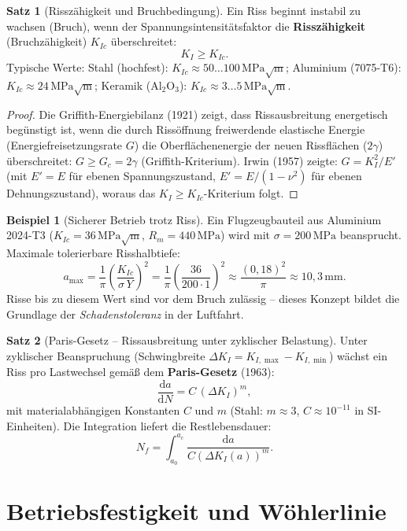 ﻿\documentclass[a4paper,12pt]{report}
\theoremstyle{definition}
\newtheorem{beispiel}{Beispiel}
\newtheorem{satz}{Satz}
\begin{document}
\begin{satz}[Risszähigkeit und Bruchbedingung]
Ein Riss beginnt instabil zu wachsen (Bruch), wenn der
Spannungsintensitätsfaktor die \textbf{Risszähigkeit} (Bruchzähigkeit) $K_{Ic}$
überschreitet:
\[
  K_I \ge K_{Ic}.
\]
Typische Werte: Stahl (hochfest): $K_{Ic} \approx 50\ldots100\,\mathrm{MPa\sqrt{m}}$;
Aluminium (7075-T6): $K_{Ic} \approx 24\,\mathrm{MPa\sqrt{m}}$;
Keramik ($\mathrm{Al_2O_3}$): $K_{Ic} \approx 3\ldots5\,\mathrm{MPa\sqrt{m}}$.
\end{satz}
\begin{proof}
Die Griffith-Energiebilanz (1921) zeigt, dass Rissausbreitung energetisch
begünstigt ist, wenn die durch Rissöffnung freiwerdende elastische
Energie (Energiefreisetzungsrate $G$) die Oberflächenenergie der
neuen Rissflächen ($2\gamma$) überschreitet:
$G \ge G_c = 2\gamma$ (Griffith-Kriterium).
Irwin (1957) zeigte: $G = K_I^2/E'$ (mit $E' = E$ für ebenen Spannungszustand,
$E' = E/(1-\nu^2)$ für ebenen Dehnungszustand), woraus das $K_I \ge K_{Ic}$-Kriterium folgt.
\end{proof}

\begin{beispiel}[Sicherer Betrieb trotz Riss]
Ein Flugzeugbauteil aus Aluminium 2024-T3 ($K_{Ic} = 36\,\mathrm{MPa\sqrt{m}}$,
$R_m = 440\,\mathrm{MPa}$) wird mit $\sigma = 200\,\mathrm{MPa}$ beansprucht.
Maximale tolerierbare Risshalbtiefe:
\[
  a_{\max} = \frac{1}{\pi}\left(\frac{K_{Ic}}{\sigma\,Y}\right)^2
  = \frac{1}{\pi}\left(\frac{36}{200\cdot 1}\right)^2 \approx \frac{(0{,}18)^2}{\pi} \approx 10{,}3\,\mathrm{mm}.
\]
Risse bis zu diesem Wert sind vor dem Bruch zulässig --
dieses Konzept bildet die Grundlage der \emph{Schadenstoleranz} in der Luftfahrt.
\end{beispiel}

\begin{satz}[Paris-Gesetz -- Rissausbreitung unter zyklischer Belastung]
Unter zyklischer Beanspruchung (Schwingbreite $\Delta K_I = K_{I,\max} - K_{I,\min}$)
wächst ein Riss pro Lastwechsel gemäß dem \textbf{Paris-Gesetz} (1963):
\[
  \frac{\mathrm{d}a}{\mathrm{d}N} = C\,(\Delta K_I)^m,
\]
mit materialabhängigen Konstanten $C$ und $m$ (Stahl: $m \approx 3$, $C \approx 10^{-11}$
in SI-Einheiten). Die Integration liefert die Restlebensdauer:
\[
  N_f = \int_{a_0}^{a_c}\frac{\mathrm{d}a}{C(\Delta K_I(a))^m}.
\]
\end{satz}

\section{Betriebsfestigkeit und Wöhlerlinie}
\end{document}
